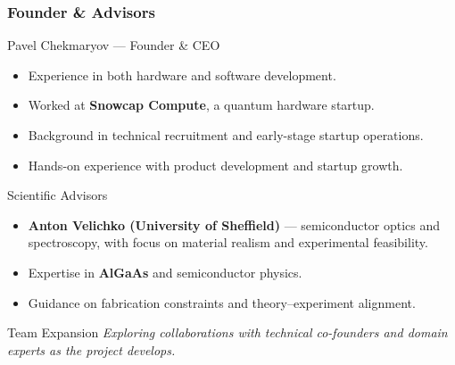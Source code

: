 \documentclass{beamer}
\begin{document}

\begin{frame}
    \frametitle{Founder \& Advisors}

    \begin{block}{Pavel Chekmaryov — Founder \& CEO}
        \begin{itemize}
            \item Experience in both hardware and software development.
            \item Worked at \textbf{Snowcap Compute}, a quantum hardware startup.
            \item Background in technical recruitment and early-stage startup operations.
            \item Hands-on experience with product development and startup growth.
        \end{itemize}
    \end{block}

    \begin{block}{Scientific Advisors}
        \begin{itemize}
            \item \textbf{Anton Velichko (University of Sheffield)} — semiconductor optics and spectroscopy, with focus on material realism and experimental feasibility.
            \item Expertise in \textbf{AlGaAs} and semiconductor physics.
            \item Guidance on fabrication constraints and theory–experiment alignment.
        \end{itemize}
    \end{block}

    \begin{block}{Team Expansion}
        \small\textit{Exploring collaborations with technical co-founders and domain experts as the project develops.}
    \end{block}

\end{frame}
\end{document}
